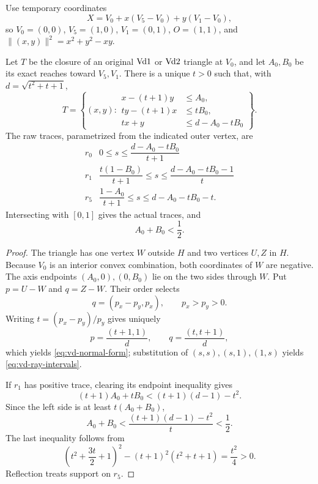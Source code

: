 Use temporary coordinates
\[
 X=V_0+x(V_5-V_0)+y(V_1-V_0),
\]
so $V_0=(0,0)$, $V_5=(1,0)$, $V_1=(0,1)$, $O=(1,1)$, and
$\lVert(x,y)\rVert^2=x^2+y^2-xy$.

\begin{proposition}
\label{prop:vd-corner-normal-form}
Let $T$ be the closure of an original $\mathrm{Vd1}$ or $\mathrm{Vd2}$ triangle at
$V_0$, and let $A_0,B_0$ be its exact reaches toward $V_5,V_1$.  There is a
unique $t>0$ such that, with $d=\sqrt{t^2+t+1}$,
\begin{equation}
 T=\left\{(x,y):
 \begin{aligned}
 x-(t+1)y&\le A_0,\\
 ty-(t+1)x&\le tB_0,\\
 tx+y&\le d-A_0-tB_0
 \end{aligned}\right\}.
 \label{eq:vd-normal-form}
\end{equation}
The raw traces, parametrized from the indicated outer vertex, are
\begin{equation}
\begin{array}{c|c}
r_0&0\le s\le\dfrac{d-A_0-tB_0}{t+1}\\[6pt]
r_1&\dfrac{t(1-B_0)}{t+1}\le s\le\dfrac{d-A_0-tB_0-1}{t}\\[8pt]
r_5&\dfrac{1-A_0}{t+1}\le s\le d-A_0-tB_0-t.
\end{array}
\label{eq:vd-ray-intervals}
\end{equation}
Intersecting with $[0,1]$ gives the actual traces, and
\begin{equation}
 A_0+B_0<\frac12.
 \label{eq:vd-half-cap}
\end{equation}
\end{proposition}

\begin{proof}
The triangle has one vertex $W$ outside $H$ and two vertices $U,Z$ in $H$.
Because $V_0$ is an interior convex combination, both coordinates of $W$ are
negative.  The axis endpoints $(A_0,0),(0,B_0)$ lie on the two sides through
$W$.  Put $p=U-W$ and $q=Z-W$.  Their order selects
\[
 q=(p_x-p_y,p_x),\qquad p_x>p_y>0.
\]
Writing $t=(p_x-p_y)/p_y$ gives uniquely
\[
 p=\frac{(t+1,1)}d,\qquad q=\frac{(t,t+1)}d,
\]
which yields \eqref{eq:vd-normal-form}; substitution of
$(s,s),(s,1),(1,s)$ yields \eqref{eq:vd-ray-intervals}.

If $r_1$ has positive trace, clearing its endpoint inequality gives
\[
 (t+1)A_0+tB_0<(t+1)(d-1)-t^2.
\]
Since the left side is at least $t(A_0+B_0)$,
\[
 A_0+B_0<\frac{(t+1)(d-1)-t^2}{t}<\frac12.
\]
The last inequality follows from
\[
 \left(t^2+\frac{3t}{2}+1\right)^2
 -(t+1)^2(t^2+t+1)=\frac{t^2}{4}>0.
\]
Reflection treats support on $r_5$.
\end{proof}

